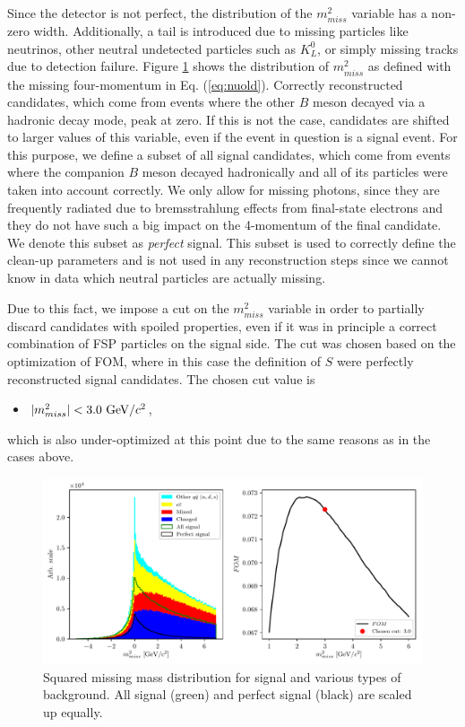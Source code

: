 Since the detector is not perfect, the distribution of the $m_{miss}^2$ variable has a non-zero width. Additionally, a tail is introduced due to missing particles like neutrinos, other neutral undetected particles such as $K_L^0$, or simply missing tracks due to detection failure. Figure \ref{fig:missm2} shows the distribution of $m_{miss}^2$ as defined with the missing four-momentum in Eq. (\ref{eq:nuold}). Correctly reconstructed candidates, which come from events where the other $B$ meson decayed via a hadronic decay mode, peak at zero. If this is not the case, candidates are shifted to larger values of this variable, even if the event in question is a signal event. For this purpose, we define a subset of all signal candidates, which come from events where the companion $B$ meson decayed hadronically and all of its particles were taken into account correctly. We only allow for missing photons, since they are frequently radiated due to bremsstrahlung effects from final-state electrons and they do not have such a big impact on the 4-momentum of the final candidate. We denote this subset as \textit{perfect} signal. This subset is used to correctly define the clean-up parameters and is not used in any reconstruction steps since we cannot know in data which neutral particles are actually missing.

Due to this fact, we impose a cut on the $m_{miss}^2$ variable in order to partially discard candidates with spoiled properties, even if it was in principle a correct combination of FSP particles on the signal side. The cut was chosen based on the optimization of FOM, where in this case the definition of $S$ were perfectly reconstructed signal candidates. The chosen cut value is 
\begin{itemize}
	\item $\vert m_{miss}^2 \vert < 3.0\mathrm{~GeV}/c^2$,
\end{itemize}
which is also under-optimized at this point due to the same reasons as in the cases above.


\begin{figure}[H]
	\centering
	\captionsetup{width=.8\linewidth}
	\includegraphics[width=\linewidth]{fig/missM2}
	\caption{Squared missing mass distribution for signal and various types of background. All signal (green) and perfect signal (black) are scaled up equally.}
	\label{fig:missm2}
\end{figure}

